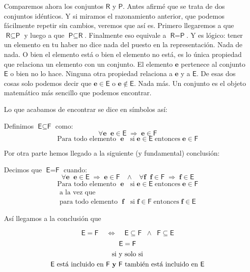 \documentclass{amsart}
\theoremstyle{definition}
\theoremstyle{remark}
\numberwithin{equation}{section}
\newcommand{\setsymbol}[1]{\textsf{#1}}
\newcommand{\sE}{\setsymbol{E}}
\newcommand{\sF}{\setsymbol{F}}
\newcommand{\sP}{\setsymbol{P}}
\newcommand{\sR}{\setsymbol{R}}
\begin{document}
	
	Comparemos ahora los conjuntos $\sR$ y $\sP$. Antes afirmé que se trata
de dos conjuntos idénticos. Y si miramos el razonamiento anterior, que
podemos fácilmente repetir sin cambios, veremos que así es. Primero
llegaremos a que $\sR\subseteq\sP$ y luego a que $\sP\subseteq\sR$.
Finalmente eso equivale a $\sR=\sP$. Y es lógico: tener un elemento en tu
haber no dice nada del puesto en la representación. Nada de nada. O bien el
elemento está o bien el elemento no está, es lo única propiedad que relaciona
un elemento con un conjunto. El elemento $\mathbf{e}$ pertenece al conjunto
$\sE$ o bien no lo hace. Ninguna otra propiedad relaciona a $\mathbf{e}$ y a
$\sE$. De esas dos cosas solo podemos decir que $\mathbf{e}\in\sE$ o
$\mathbf{e}\notin\sE$. Nada más. Un conjunto es el objeto matemático más
sencillo que podemos encontrar.
	
	
	Lo que acabamos de encontrar se dice en símbolos así:
	
	
	Definimos $\sE\subseteq\sF$ como:
	$$\forall \mathbf{e} \;\; \mathbf{e}\in\sE \;\Rightarrow\;
\mathbf{e}\in\sF$$
	$$\text{Para todo elemento }\; \mathbf{e} \;\; \text{ si
}\;\mathbf{e}\in\sE \;\text{entonces}\; \mathbf{e}\in\sF$$
	
	
	Por otra parte hemos llegado a la siguiente (y fundamental) conclusión:
	
	
	Decimos que $\sE = \sF$ cuando:
	$$\forall \mathbf{e} \;\; \mathbf{e}\in\sE \;\Rightarrow\;
\mathbf{e}\in\sF\;\;\;\wedge\;\;\;\forall \mathbf{f} \;\; \mathbf{f}\in\sF
\;\Rightarrow\; \mathbf{f}\in\sE$$
	\begin{gather*}
		\text{Para todo elemento }\; \mathbf{e} \;\; \text{ si
}\;\mathbf{e}\in\sE \;\text{entonces}\; \mathbf{e}\in\sF\\
		\text{ a la vez que } \\
		\text{ para todo elemento }\; \mathbf{f} \;\; \text{ si
}\;\mathbf{f}\in\sF \;\text{entonces}\; \mathbf{f}\in\sE
	\end{gather*}
	
	
	
	Así llegamos a la conclusión que


	$$ \sE = \sF \;\;\;\; \Leftrightarrow \;\;\;\;  \sE\subseteq\sF
\;\;\wedge\;\;\sF\subseteq\sE$$
	\begin{gather*}
		\sE = \sF\\
		\text{ si y solo si } \\
		\sE \text{ está incluido en } \sF \text{ \textbf{y} }\sF \text{
también está incluido en } \sE 
	\end{gather*}
	
\end{document}
